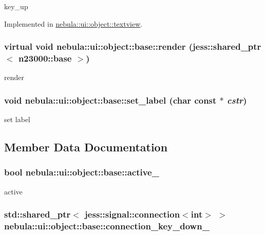 key\_\-up 

Implemented in \hyperlink{classnebula_1_1ui_1_1object_1_1textview_a00601569990afebe08f582b5fcebde08}{nebula::ui::object::textview}.\hypertarget{classnebula_1_1ui_1_1object_1_1base_a37483fa4e6e5f11a5e0262cf83d6f527}{
\subsubsection[{render}]{\setlength{\rightskip}{0pt plus 5cm}virtual void nebula::ui::object::base::render (jess::shared\_\-ptr$<$ {\bf n23000::base} $>$)}}
\label{classnebula_1_1ui_1_1object_1_1base_a37483fa4e6e5f11a5e0262cf83d6f527}


render \hypertarget{classnebula_1_1ui_1_1object_1_1base_a9b3115974df110ba5d5733d289f4e30f}{
\subsubsection[{set\_\-label}]{\setlength{\rightskip}{0pt plus 5cm}void nebula::ui::object::base::set\_\-label (char const $\ast$ {\em cstr})}}
\label{classnebula_1_1ui_1_1object_1_1base_a9b3115974df110ba5d5733d289f4e30f}
set label 

\subsection{Member Data Documentation}
\hypertarget{classnebula_1_1ui_1_1object_1_1base_a33adf260d90d85672d531daa45231973}{
\subsubsection[{active\_\-}]{\setlength{\rightskip}{0pt plus 5cm}bool {\bf nebula::ui::object::base::active\_\-}}}
\label{classnebula_1_1ui_1_1object_1_1base_a33adf260d90d85672d531daa45231973}


active \hypertarget{classnebula_1_1ui_1_1object_1_1base_a345044fef1a810531d75b5a59c862c02}{
\subsubsection[{connection\_\-key\_\-down\_\-}]{\setlength{\rightskip}{0pt plus 5cm}std::shared\_\-ptr$<$ jess::signal::connection$<$int$>$ $>$ {\bf nebula::ui::object::base::connection\_\-key\_\-down\_\-}}}
\label{classnebula_1_1ui_1_1object_1_1base_a345044fef1a810531d75b5a59c862c02}


